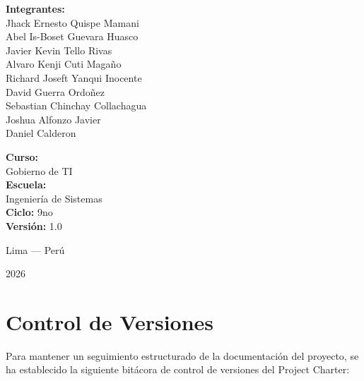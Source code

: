 \documentclass[11pt]{article}
\begin{document}
\begin{titlepage}
  \begin{minipage}[t]{0.55\textwidth}
    \begin{flushleft} \large
      \textbf{Integrantes:}\\
      \smallskip
      \small
      Jhack Ernesto Quispe Mamani\\
      Abel Is-Boset Guevara Huasco\\
      Javier Kevin Tello Rivas\\
      Alvaro Kenji Cuti Magaño\\
      Richard Joseft Yanqui Inocente\\
      David Guerra Ordoñez\\
      Sebastian Chinchay Collachagua\\
      Joshua Alfonzo Javier\\
      Daniel Calderon
    \end{flushleft}
  \end{minipage}
  \hfill
  \begin{minipage}[t]{0.38\textwidth}
    \begin{flushright} \large
      \textbf{Curso:}\\
      \smallskip
      \small Gobierno de TI \\
      \vspace{0.4cm}
      \textbf{Escuela:} \\
      \small Ingeniería de Sistemas \\
      \vspace{0.4cm}
      \textbf{Ciclo:} \small 9no \\
      \vspace{0.4cm}
      \textbf{Versión:} \small 1.0
    \end{flushright}
  \end{minipage}
  
  \vfill
  
  {\large Lima --- Perú \par}
  {\large 2026 \par}
\end{titlepage}

\newpage
{}
\thispagestyle{plain}
\tableofcontents
\newpage
{}

\section{Control de Versiones}

Para mantener un seguimiento estructurado de la documentación del proyecto, se ha establecido la siguiente bitácora de control de versiones del Project Charter:
\end{document}
